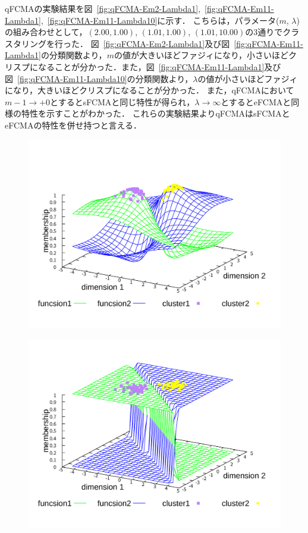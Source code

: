 \documentclass[twocolumn, a4paper]{icethesisabst}
\begin{document}
qFCMAの実験結果を図~\ref{fig:qFCMA-Em2-Lambda1},~\ref{fig:qFCMA-Em11-Lambda1},~\ref{fig:qFCMA-Em11-Lambda10}に示す．
こちらは，パラメータ($m$, $\lambda$)の組み合わせとして，$(2.00, 1.00)$, $(1.01, 1.00)$, $(1.01, 10.00)$の3通りでクラスタリングを行った．
図~\ref{fig:qFCMA-Em2-Lambda1}及び図~\ref{fig:qFCMA-Em11-Lambda1}の分類関数より，$m$の値が大きいほどファジィになり，小さいほどクリスプになることが分かった．また，図~\ref{fig:qFCMA-Em11-Lambda1}及び図~\ref{fig:qFCMA-Em11-Lambda10}の分類関数より，$\lambda$の値が小さいほどファジィになり，大きいほどクリスプになることが分かった．
また，qFCMAにおいて$m-1\rightarrow+0$とするとsFCMAと同じ特性が得られ，$\lambda\rightarrow\infty$とするとeFCMAと同様の特性を示すことがわかった．
これらの実験結果よりqFCMAはsFCMAとeFCMAの特性を併せ持つと言える．

\begin{figure}[htbp]
 \centering
 \begin{minipage}{0.43\hsize}
  \includegraphics[width=\linewidth]{sFCMA-Em2.pdf}
  \label{fig:sFCMA-Em2}
 \end{minipage}
 \begin{minipage}{0.43\hsize}
  \includegraphics[width=\linewidth]{sFCMA-Em11.pdf}

\end{minipage}
\end{figure}
\end{document}
